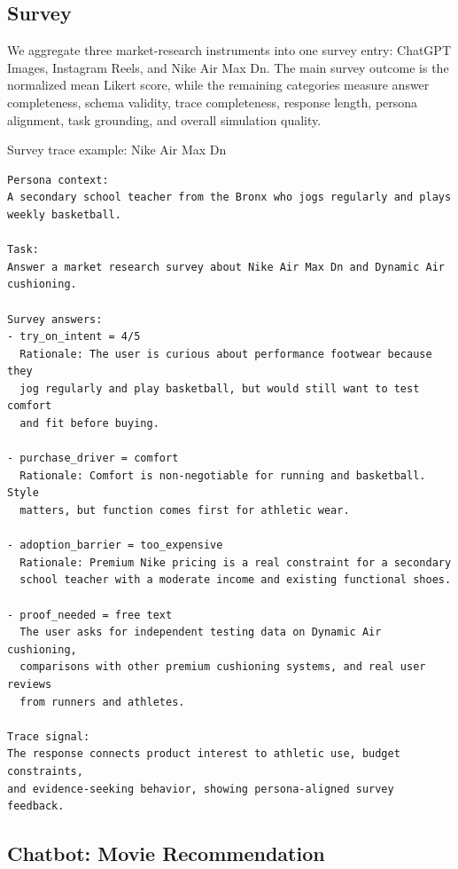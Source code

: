 \subsection{Survey}
\label{app:survey-results}

We aggregate three market-research instruments into one survey entry: ChatGPT Images, Instagram Reels, and Nike Air Max Dn. The main survey outcome is the normalized mean Likert score, while the remaining categories measure answer completeness, schema validity, trace completeness, response length, persona alignment, task grounding, and overall simulation quality.

\begin{promptbox}[label={box:trace-survey}]{Survey trace example: Nike Air Max Dn}
\begin{lstlisting}
Persona context:
A secondary school teacher from the Bronx who jogs regularly and plays
weekly basketball.

Task:
Answer a market research survey about Nike Air Max Dn and Dynamic Air
cushioning.

Survey answers:
- try_on_intent = 4/5
  Rationale: The user is curious about performance footwear because they
  jog regularly and play basketball, but would still want to test comfort
  and fit before buying.

- purchase_driver = comfort
  Rationale: Comfort is non-negotiable for running and basketball. Style
  matters, but function comes first for athletic wear.

- adoption_barrier = too_expensive
  Rationale: Premium Nike pricing is a real constraint for a secondary
  school teacher with a moderate income and existing functional shoes.

- proof_needed = free text
  The user asks for independent testing data on Dynamic Air cushioning,
  comparisons with other premium cushioning systems, and real user reviews
  from runners and athletes.

Trace signal:
The response connects product interest to athletic use, budget constraints,
and evidence-seeking behavior, showing persona-aligned survey feedback.
\end{lstlisting}
\end{promptbox}

\subsection{Chatbot: Movie Recommendation}
\label{app:movie-results}

